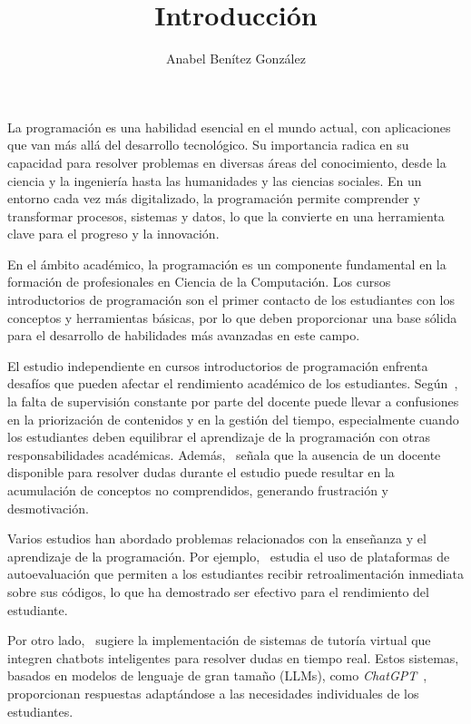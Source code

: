 \documentclass{article}
\title{Introducción}
\author{Anabel Benítez González}
\date{}
\begin{document}
\maketitle

La programación es una habilidad esencial en el mundo actual, con aplicaciones que van más allá del desarrollo tecnológico. Su importancia radica en su capacidad para resolver problemas en diversas áreas del conocimiento, desde la ciencia y la ingeniería hasta las humanidades y las ciencias sociales. En un entorno cada vez más digitalizado, la programación permite comprender y transformar procesos, sistemas y datos, lo que la convierte en una herramienta clave para el progreso y la innovación.

En el ámbito académico, la programación es un componente fundamental en la formación de profesionales en Ciencia de la Computación. Los cursos introductorios de programación son el primer contacto de los estudiantes con los conceptos y herramientas básicas, por lo que deben proporcionar una base sólida para el desarrollo de habilidades más avanzadas en este campo.

El estudio independiente en cursos introductorios de programación enfrenta desafíos que pueden afectar el rendimiento académico de los estudiantes. Según~\cite{proskuraLytvynova2020}, la falta de supervisión constante por parte del docente puede llevar a confusiones en la priorización de contenidos y en la gestión del tiempo, especialmente cuando los estudiantes deben equilibrar el aprendizaje de la programación con otras responsabilidades académicas. Además,~\cite{overklift2019} señala que la ausencia de un docente disponible para resolver dudas durante el estudio puede resultar en la acumulación de conceptos no comprendidos, generando frustración y desmotivación.

Varios estudios han abordado problemas relacionados con la enseñanza y el aprendizaje de la programación. Por ejemplo,~\cite{Gabbay2022, Hanafi2023, Messer2024} estudia el uso de plataformas de autoevaluación que permiten a los estudiantes recibir retroalimentación inmediata sobre sus códigos, lo que ha demostrado ser efectivo para el rendimiento del estudiante.

Por otro lado,~\cite{dong2025buildaitutoradapt} sugiere la implementación de sistemas de tutoría virtual que integren chatbots inteligentes para resolver dudas en tiempo real. Estos sistemas, basados en modelos de lenguaje de gran tamaño (LLMs), como \textit{ChatGPT}~\cite{chatgpt}, proporcionan respuestas adaptándose a las necesidades individuales de los estudiantes.
\end{document}
